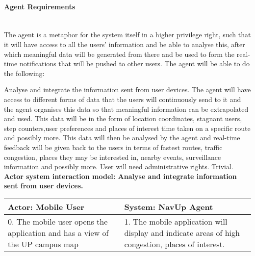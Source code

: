 \paragraph{Agent Requirements}\mbox{}\\
The agent is a metaphor for the system itself in a higher privilege right, such that it will have access to all the users' information and be able to analyse this, after which meaningful data will be generated from there and be used to form the real-time notifications that will be pushed to other users. The agent will be able to do the following:
\\
\bigskip

\FuncReq
{Analyse and integrate the information sent from user devices.}
{The agent will have access to different forms of data that the users will continuously send to it and the agent organises this data so that meaningful information can be extrapolated and used. This data will be in the form of location coordinates, stagnant users, step counters,user preferences and places of interest time taken on a specific route and possibly more. This data will then be analysed by the agent and real-time feedback will be given back to the users in terms of fastest routes, traffic congestion, places they may be interested in, nearby events, surveillance information and possibly more.}
{User will need administrative rights.}
{Trivial.}
    \\
    \textbf{Actor system interaction model: Analyse and integrate information sent from user devices. }\\
    \begin{tabular}{ | p{6cm} | p{6cm} |}
    \hline
    Actor: Mobile User & System: NavUp Agent\\ \hline
     0. The mobile user opens the application and has a view of the UP campus map & 1. The mobile application will display and indicate areas of high congestion, places of interest.\\ \hline
    
    \end{tabular}
\\
\bigskip


